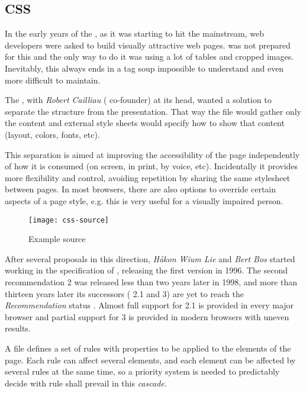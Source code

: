\subsection{CSS} %
\label{sub:css}

In the early years of the , as it was starting to hit the mainstream, web developers were asked to build visually attractive web pages.
 was not prepared for this and the only way to do it was using a lot of tables and cropped images.
Inevitably, this always ends in a tag soup impossible to understand and even more difficult to maintain.

The , with \emph{Robert Cailliau} ( co-founder) at its head, wanted a solution to separate the structure from the presentation.
That way the  file would gather only the content and external style sheets would specify how to show that content (layout, colors, fonts, etc).

This separation is aimed at improving the accessibility of the page independently of how it is consumed (on screen, in print, by voice, etc).
Incidentally it provides more flexibility and control, avoiding repetition by sharing the same stylesheet between pages.
In most browsers, there are also options to override certain aspects of a page style, e.g. this is very useful for a visually impaired person.

\begin{wrapfigure}{r}{0.5\textwidth}
  \centering
    \texttt{[image: css-source]}
  \caption{Example  source}
  \label{fig:css-source}
\end{wrapfigure}

After several proposals in this direction, \emph{Håkon Wium Lie} and \emph{Bert Bos} started working in the specification of , releasing the first version in 1996.
The second recommendation  2 was released less than two years later in 1998, and more than thirteen years later its successors ( 2.1  \cite{CSS2} and  3) are yet to reach the \emph{Recommendation} status \cite{CSS}.
Almost full support for  2.1 is provided in every major browser and partial support for  3 is provided in modern browsers with uneven results.

A  file defines a set of rules with properties to be applied to the elements of the page.
Each rule can affect several elements, and each element can be affected by several rules at the same time, so a priority system is needed to predictably decide with rule shall prevail in this \emph{cascade}.

